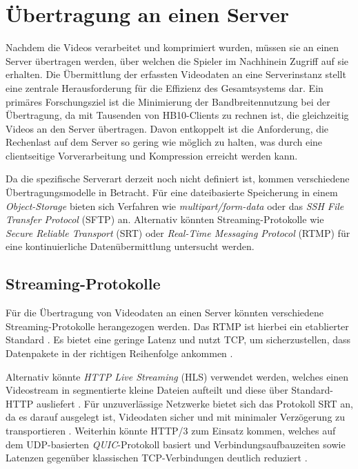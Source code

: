 
\section{Übertragung an einen Server}

Nachdem die Videos verarbeitet und komprimiert wurden, müssen sie an einen Server übertragen werden, über welchen die Spieler im Nachhinein Zugriff auf sie erhalten.
Die Übermittlung der erfassten Videodaten an eine Serverinstanz stellt eine zentrale Herausforderung für die Effizienz des Gesamtsystems dar. Ein primäres Forschungsziel ist die Minimierung der Bandbreitennutzung bei der Übertragung, 
da mit Tausenden von HB10-Clients zu rechnen ist, die gleichzeitig Videos an den Server übertragen. Davon entkoppelt 
ist die Anforderung, die Rechenlast auf dem Server so gering wie möglich zu halten, was durch eine clientseitige Vorverarbeitung und Kompression erreicht werden kann. \newline

Da die spezifische Serverart derzeit noch nicht definiert ist, kommen verschiedene Übertragungsmodelle in Betracht. Für eine dateibasierte Speicherung in einem \textit{Object-Storage} \parencite{susnjara_2025_object} bieten sich Verfahren wie 
\textit{multipart/form-data} \parencite{muhibullah_2024_understanding} oder das \textit{SSH File Transfer Protocol} (SFTP)\parencite{_2020_scp} an. Alternativ könnten Streaming-Protokolle wie \textit{Secure Reliable Transport} (SRT)\parencite{haivision_2025_srtdocsreadmemd} oder 
\textit{Real-Time Messaging Protocol} (RTMP) \parencite{_2023_was} für eine kontinuierliche Datenübermittlung untersucht werden.

\subsection{Streaming-Protokolle}

Für die Übertragung von Videodaten an einen Server könnten verschiedene Streaming-Protokolle herangezogen werden. Das RTMP ist hierbei ein etablierter Standard \parencite{byrd_2026_what}. 
Es bietet eine geringe Latenz \parencite{skavish_2022_ein} und nutzt TCP, um sicherzustellen, dass Datenpakete in der richtigen Reihenfolge ankommen \parencite{_2023_was}.\newline  

Alternativ könnte \textit{HTTP Live Streaming} (HLS) verwendet werden, welches einen Videostream in segmentierte kleine Dateien aufteilt und diese über Standard-HTTP ausliefert \parencite{_2026_eigener}. Für unzuverlässige Netzwerke bietet 
sich das Protokoll SRT an, da es darauf ausgelegt ist, Videodaten sicher und mit minimaler Verzögerung zu transportieren \parencite{haivision_2025_srtdocsreadmemd}. Weiterhin könnte HTTP/3 zum Einsatz kommen,
welches auf dem UDP-basierten \textit{QUIC}-Protokoll basiert und Verbindungsaufbauzeiten sowie Latenzen gegenüber klassischen TCP-Verbindungen deutlich reduziert \parencite{_2021_was, iyengar_2021_rfc, litespeedtech_2026_github}.\newline  

